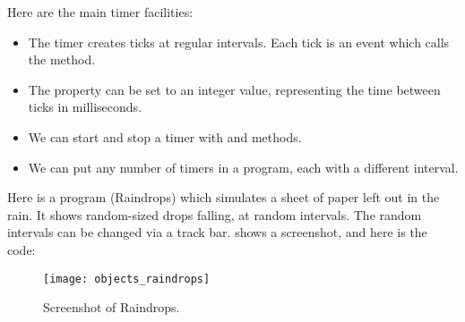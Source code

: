 		Here are the main timer facilities:
		\begin{itemize}
			\item The timer creates ticks at regular intervals. Each tick is an event which calls the  method.
			\item The  property can be set to an integer value, representing the time between ticks in milliseconds.
			\item We can start and stop a timer with  and  methods.
			\item We can put any number of timers in a program, each with a different interval.
		\end{itemize}
		Here is a program (Raindrops) which simulates a sheet of paper left out in the rain. It shows random-sized drops falling, at random intervals. The random intervals can be changed via a track bar.  shows a screenshot, and here is the code:
		\begin{figure}[ht]
			\centering
			\texttt{[image: objects\_raindrops]}
			\caption{Screenshot of Raindrops.}
			\label{fig:objects_raindrops}
		\end{figure}

